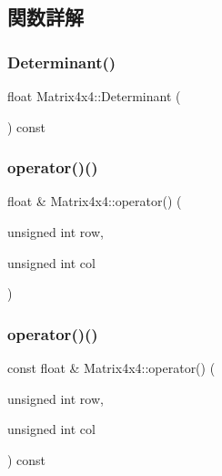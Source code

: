 \subsection{関数詳解}
\mbox{\label{struct_math_1_1_matrix4x4_ab848d45dfc3a1efb60601214488d2e4a}} 
\subsubsection{\texorpdfstring{Determinant()}{Determinant()}}
{\footnotesize\ttfamily float Matrix4x4\+::\+Determinant (\begin{DoxyParamCaption}{ }\end{DoxyParamCaption}) const}

\mbox{\label{struct_math_1_1_matrix4x4_a9a2d9a85d02f98341b7406fbdf39d60a}} 
\subsubsection{\texorpdfstring{operator()()}{operator()()}\hspace{0.1cm}{\footnotesize\ttfamily [1/2]}}
{\footnotesize\ttfamily float \& Matrix4x4\+::operator() (\begin{DoxyParamCaption}\item[{unsigned int}]{row,  }\item[{unsigned int}]{col }\end{DoxyParamCaption})}

\mbox{\label{struct_math_1_1_matrix4x4_afdbffc353a52b2aa9b622b47bb13b9c9}} 
\subsubsection{\texorpdfstring{operator()()}{operator()()}\hspace{0.1cm}{\footnotesize\ttfamily [2/2]}}
{\footnotesize\ttfamily const float \& Matrix4x4\+::operator() (\begin{DoxyParamCaption}\item[{unsigned int}]{row,  }\item[{unsigned int}]{col }\end{DoxyParamCaption}) const}

